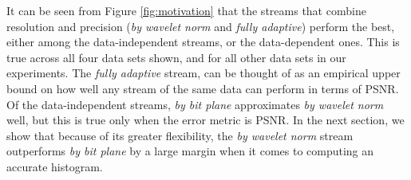 It can be seen from Figure \ref{fig:motivation} that the streams that combine resolution and
precision (\emph{by wavelet norm} and \emph{fully adaptive}) perform the best, either among the
data-independent streams, or the data-dependent ones. This is true across all four data sets shown,
and for all other data sets in our experiments. The \emph{fully adaptive} stream, can be thought of
as an empirical upper bound on how well any stream of the same data can perform in terms of PSNR. Of
the data-independent streams, \emph{by bit plane} approximates \emph{by wavelet norm}  well, but this
is true only when the error metric is PSNR. In the next section, we show that because of its greater
flexibility, the \emph{by wavelet norm} stream outperforms \emph{by bit plane} by a large margin
when it comes to computing an accurate histogram.




